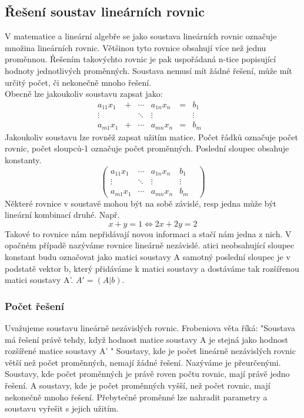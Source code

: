 \documentclass[10pt,a4paper]{article}
\begin{document}
\subsection{Řešení soustav lineárních rovnic}
V matematice a lineární algebře se jako soustava lineárních rovnic označuje množina lineárních rovnic. Většinou tyto rovnice obsahují více než jednu proměnnou. Řešením takovýchto rovnic je pak uspořádaná n-tice popisující hodnoty jednotlivých proměnných. Soustava nemusí mít žádné řešení, může mít určitý počet, či nekonečně mnoho řešení. \\
Obecně lze jakoukoliv soustavu zapsat jako:
\[\begin{matrix} a_{11}x_{1} & + & \cdots & a_{1n}x_{n} & = & b_1 & \\ \vdots & & \ddots & \vdots & & \vdots & \\ a_{m1}x_{1} & + & \cdots & a_{mn}x_{n} & = & b_m & \end{matrix}\]
Jakoukoliv soustavu lze rovněž zapsat užitím matice. Počet řádků označuje počet rovnic, počet sloupců-1 označuje počet proměnných. Poslední sloupec obsahuje konstanty.
\[\begin{pmatrix} a_{11}x_{1} & \cdots & a_{1n}x_{n} & b_1 & \\ \vdots & \ddots & \vdots & \vdots & \\ a_{m1}x_{1} & \cdots & a_{mn}x_{n} & b_m & \end{pmatrix}\]
Některé rovnice v soustavě mohou být na sobě závislé, resp jedna může být lineární kombinací druhé. Např. 
\[x + y = 1 \Leftrightarrow 2x + 2y = 2\]
Takové to rovnice nám nepřidávají novou informaci a stačí nám jedna z nich. V opačném případě nazýváme rovnice lineárně nezávislé.
atici neobsahující sloupec konstant budu označovat jako matici soustavy A samotný poslední sloupec je v podstatě vektor b, který přidáváme k matici soustavy a dostáváme tak rozšířenou matici soustavy A'. $A' = (A|b)$.
\subsubsection{Počet řešení}
Uvažujeme soustavu lineárně nezávislých rovnic.
Frobeniova věta říká: "Soustava má řešení právě tehdy, když hodnost matice soustavy A je stejná jako hodnost rozšířené matice soustavy A' "
Soustavy, kde je počet lineárně nezávislých rovnic větší než počet proměnných, nemají žádné řešení. Nazýváme je přeurčenými.
Soustavy, kde počet proměnných je právě roven počtu rovnic, mají právě jedno řešení.
A soustavy, kde je počet proměnných vyšší, než počet rovnic, mají nekonečně mnoho řešení. Přebytečné proměnné lze nahradit parametry a soustavu vyřešit s jejich užitím.
\end{document}
